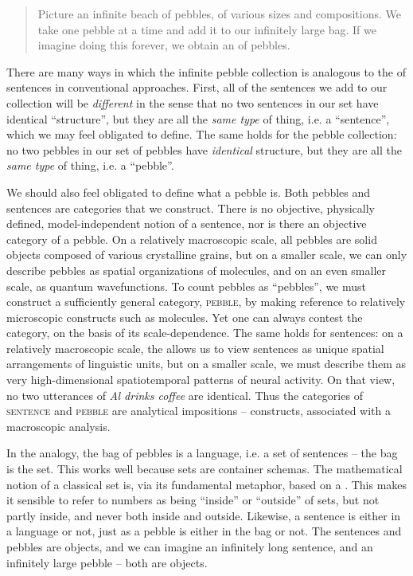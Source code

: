 \begin{quote}
    Picture an infinite beach of pebbles, of various sizes and compositions. We take one pebble at a time and add it to our infinitely large bag. If we imagine doing this forever, we obtain an  of pebbles. 
\end{quote}

  There are many ways in which the infinite pebble collection is analogous to the  of sentences in conventional approaches. First, all of the sentences we add to our collection will be \textit{different} in the sense that no two sentences in our set have identical “structure”, but they are all the \textit{same type} of thing, i.e. a “sentence”, which we may feel obligated to define. The same holds for the pebble collection: no two pebbles in our set of pebbles have \textit{identical} structure, but they are all the \textit{same type} of thing, i.e. a “pebble”. 
  
  We should also feel obligated to define what a pebble is. Both pebbles and sentences are categories that we construct. There is no objective, physically defined, model-independent notion of a sentence, nor is there an objective category of a pebble. On a relatively macroscopic scale, all pebbles are solid objects composed of various crystalline grains, but on a smaller scale, we can only describe pebbles as spatial organizations of molecules, and on an even smaller scale, as quantum wavefunctions. To count pebbles as “pebbles”, we must construct a sufficiently general category, \textsc{pebble}, by making reference to relatively microscopic constructs such as molecules. Yet one can always contest the category, on the basis of its scale-dependence. The same holds for sentences: on a relatively macroscopic scale, the  allows us to view sentences as unique spatial arrangements of linguistic units, but on a smaller scale, we must describe them as very high-di\-men\-sional spatiotemporal patterns of neural activity. On that view, no two utterances of \textit{Al drinks coffee} are identical. Thus the categories of \textsc{sentence} and \textsc{pebble} are analytical impositions -- constructs, associated with a macroscopic analysis. 

  In the analogy, the bag of pebbles is a language, i.e. a set of sentences -- the bag is the set. This works well because sets are container schemas. The mathematical notion of a classical set is, via its fundamental metaphor, based on a  \citep{LakoffNúñez2000}. This makes it sensible to refer to numbers as being “inside” or “outside” of sets, but not partly inside, and never both inside and outside. Likewise, a sentence is either in a language or not, just as a pebble is either in the bag or not. The sentences and pebbles are objects, and we can imagine an infinitely long sentence, and an infinitely large pebble -- both are objects. 

